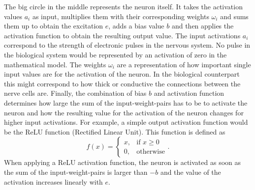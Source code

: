 The big circle in the middle represents the neuron itself. It takes the activation values $a_i$ as input, multiplies them with their corresponding weights $\omega_i$ and sums them up to obtain the excitation $e$, adds a bias value $b$ and then applies the activation function to obtain the resulting output value. The input activations $a_i$ correspond to the strength of electronic pulses in the nervous system. No pulse in the biological system would be represented by an activation of zero in the mathematical model. The weights $\omega_i$ are a representation of how important single input values are for the activation of the neuron. In the biological counterpart this might correspond to how thick or conductive the connections between the nerve cells are. Finally, the combination of bias $b$ and activation function determines how large the sum of the input-weight-pairs has to be to activate the neuron and how the resulting value for the activation of the neuron changes for higher input activations. For example, a simple output activation function would be the ReLU function (Rectified Linear Unit).
This function is defined as \cite{ActivationFunctionOverview}
\begin{equation}
	f(x) = 
	\begin{cases}
		x, &\text{if } x\geq0 \\
		0, &\text{otherwise}
	\end{cases}.
\end{equation} 
When applying a ReLU activation function, the neuron is activated as soon as the sum of the input-weight-pairs is larger than $-b$ and the value of the activation increases linearly with $e$.
